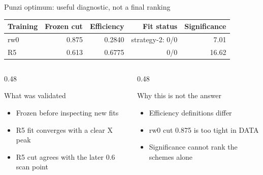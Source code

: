 \documentclass[11pt,aspectratio=169]{beamer}
\begin{document}
\begin{frame}{Punzi optimum: useful diagnostic, not a final ranking}
  \vspace{4pt}
  \begin{center}
    \begin{tabular}{lrrrr}
      \toprule
      Training & Frozen cut & Efficiency & Fit status & Significance \\
      \midrule
      rw0 & 0.875 & 0.2840 & strategy-2: 0/0 & 7.01 \\
      R5  & 0.613 & 0.6775 & 0/0 & 16.62 \\
      \bottomrule
    \end{tabular}
  \end{center}
  \vspace{0.8em}
  \begin{columns}[T]
    \begin{column}{0.48\textwidth}
      \begin{block}{What was validated}
        \begin{itemize}
          \item Frozen before inspecting new fits
          \item R5 fit converges with a clear X peak
          \item R5 cut agrees with the later 0.6 scan point
        \end{itemize}
      \end{block}
    \end{column}
    \begin{column}{0.48\textwidth}
      \begin{alertblock}{Why this is not the answer}
        \begin{itemize}
          \item Efficiency definitions differ
          \item rw0 cut 0.875 is too tight in DATA
          \item Significance cannot rank the schemes alone
        \end{itemize}
      \end{alertblock}
    \end{column}
  \end{columns}
\end{frame}
\end{document}
